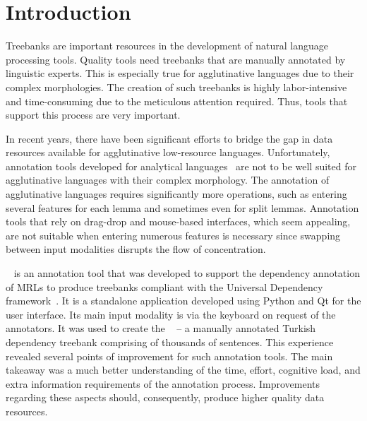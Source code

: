 \section{Introduction}
\label{sec:introduction}

Treebanks are important resources in the development of natural language processing tools.
Quality tools need treebanks that are manually annotated by linguistic experts. 
This is especially true for agglutinative languages due to their complex morphologies. 
The creation of such treebanks is highly labor-intensive and time-consuming due to the meticulous attention required.
Thus, tools that support this process are very important.

In recent years, there have been significant efforts to bridge the gap in data resources available for agglutinative low-resource languages.
Unfortunately, annotation tools developed for analytical languages~\cite{UD-tools} are not to be well suited for agglutinative languages with their complex morphology.
The annotation of agglutinative  languages requires significantly more operations, such as entering several features for each lemma and sometimes even for split lemmas.
Annotation tools that rely on drag-drop and mouse-based interfaces, which seem appealing, are not suitable when entering numerous features is necessary since swapping between input modalities disrupts the flow of concentration.

\boatvone~\cite{turk2021resources} is an annotation tool that was developed to support the dependency annotation of MRLs to produce treebanks compliant with the Universal Dependency framework~\cite{UD}.
It is a standalone application developed using Python and Qt for the user interface.
Its main input modality is via the keyboard on request of the annotators. 
It was used to create the \bountreebank~\cite{turk-etal-2019-turkish,turk2021resources,UD-Boun-Treebank} -- a manually annotated Turkish dependency treebank comprising of thousands of sentences.
This experience revealed several points of improvement for such annotation tools.
The main takeaway was a much better understanding of the time, effort, cognitive load, and extra information requirements of the annotation process.
Improvements regarding these aspects should, consequently, produce higher quality data resources.


